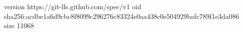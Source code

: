 version https://git-lfs.github.com/spec/v1
oid sha256:acdbe1a6d9cbc8f8099c296276c83324e0aa438c0e504929bafc789f1e3da086
size 11068
